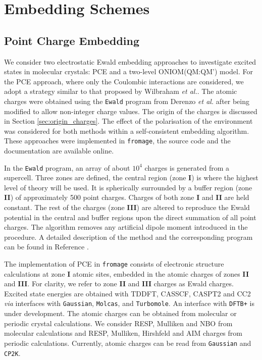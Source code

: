 \section{Embedding Schemes}
\label{sec:theo}
\subsection{Point Charge Embedding}
We consider two electrostatic Ewald embedding approaches to investigate excited states in molecular crystals: PCE and a two-level ONIOM(QM:QM') model. For the PCE approach, where only the Coulombic interactions are considered, we adopt a strategy similar to that proposed by Wilbraham \textit{et al.}\cite{Wilbraham2016a}. The atomic charges were obtained using the \texttt{Ewald} program from Derenzo \textit{et al.} \cite{Derenzo2000} after being modified to allow non-integer charge values. The origin of the charges is discussed in Section \ref{sec:origin_charges}. The effect of the polarisation of the environment was considered for both methods within a self-consistent embedding algorithm. These approaches were implemented in \texttt{fromage}, the source code and the documentation are available online.\cite{fromage,fromagedoc}

In the \texttt{Ewald} program,\cite{Derenzo2000} an array of about $10^{4}$ charges is generated from a supercell. Three zones are defined, the central region (zone \textbf{I}) is where the highest level of theory will be used. It is spherically surrounded by a buffer region (zone \textbf{II}) of approximately 500 point charges. Charges of both zone \textbf{I} and \textbf{II} are held constant. The rest of the charges (zone \textbf{III}) are altered to reproduce the Ewald potential in the central and buffer regions upon the direct summation of all point charges. The algorithm removes any artificial dipole moment introduced in the procedure. A detailed description of the method and the corresponding program can be found in Reference .

The implementation of PCE in \texttt{fromage} consists of electronic structure calculations at zone \textbf{I} atomic sites, embedded in the atomic charges of zones \textbf{II} and \textbf{III}. For clarity, we refer to zone \textbf{II} and \textbf{III} charges as Ewald charges. Excited state energies are obtained with TDDFT, CASSCF, CASPT2 and CC2 \textit{via} interfaces with \texttt{Gaussian},\cite{g16} \texttt{Molcas},\cite{Aquilante2016} and \texttt{Turbomole}\cite{TURBOMOLE}. An interface with \texttt{DFTB+}\cite{Aradi2007} is under development. The atomic charges can be obtained from molecular or periodic crystal calculations. We consider RESP, Mulliken and NBO from molecular calculations and RESP, Mulliken, Hirshfeld and AIM charges from periodic calculations. Currently, atomic charges can be read from \texttt{Gaussian} and \texttt{CP2K}.
  
